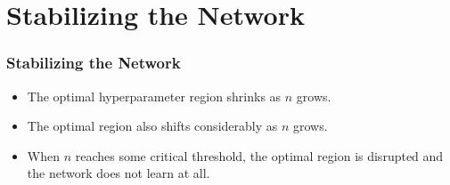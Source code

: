 \section{Stabilizing the Network}


\begin{frame}
\frametitle{Stabilizing the Network}

\begin{itemize}
    \item The optimal hyperparameter region shrinks as \(n\) grows.
    \item The optimal region also shifts considerably as \(n\) grows.
    \item When \(n\) reaches some critical threshold, the optimal region is disrupted and the network does not learn at all.
\end{itemize}

\end{frame}


